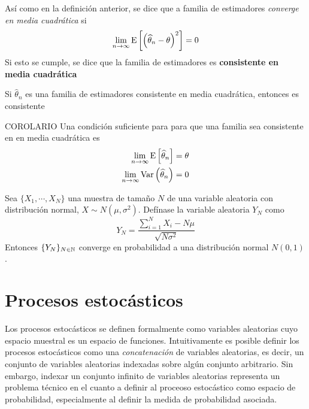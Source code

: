 \begin{definicion}
Así como en la definición anterior, se dice que a familia de estimadores \textit{converge en media cuadrática} si
\begin{equation}
\lim_{n\rightarrow\infty} \mathrm{E}\left[ \left( \widehat{\theta}_n - \theta \right)^{2} \right] = 0
\end{equation}
Si esto se cumple, se dice que la familia de estimadores es \textbf{consistente en media cuadrática} \end{definicion}

\begin{proposicion}
Si $\widehat{\theta}_n$ es una familia de estimadores consistente en media cuadrática, entonces es consistente
\end{proposicion}

\begin{proposicion} COROLARIO
Una condición suficiente para para que una familia sea consistente en en media cuadrática es
\begin{align}
\lim_{n\rightarrow\infty} \mathrm{E}\left[ \widehat{\theta}_n \right] &= \theta \\
\lim_{n\rightarrow\infty} \mathrm{Var}\left( \widehat{\theta}_n \right) &= 0
\end{align}
\end{proposicion}


\begin{teorema}
Sea $\{ X_1, \cdots, X_N\}$ una muestra de tamaño $N$ de una variable aleatoria con distribución normal, $X\sim N(\mu,\sigma^{2})$. Defínase la variable aleatoria $Y_N$ como
\begin{equation}
Y_N = \frac{\sum_{i=1}^{N}X_i - N \mu}{\sqrt{N \sigma^{2}}}
\end{equation}
Entonces $\{ Y_N \}_{N \in \mathbb{N}}$ converge en probabilidad a una distribución normal $N(0,1)$.
\end{teorema}



\section{Procesos estocásticos}

Los procesos estocásticos se definen formalmente como variables aleatorias cuyo espacio muestral es un espacio de funciones.
%
Intuitivamente es posible definir %
los procesos estocásticos como una \textit{concatenación} de variables aleatorias, es decir, un conjunto de variables aleatorias indexadas sobre algún conjunto arbitrario.
%
Sin embargo, indexar un conjunto infinito de variables aleatorias representa un problema técnico en el cuanto a definir al proceoso estocástico como espacio de probabilidad, especialmente al definir la medida de probabilidad asociada.

